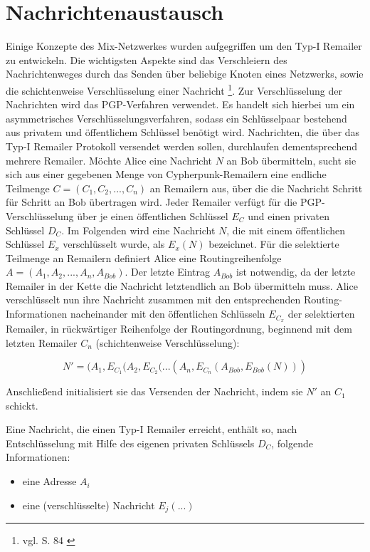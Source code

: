 \section{Nachrichtenaustausch}
Einige Konzepte des Mix-Netzwerkes wurden aufgegriffen um den Typ-I Remailer zu entwickeln. Die wichtigsten Aspekte sind das Verschleiern des Nachrichtenweges durch das Senden über beliebige Knoten eines Netzwerks, sowie die schichtenweise Verschlüsselung einer Nachricht \footnote{vgl. S. 84 \cite{sambleben2013informationstechnologie}}. Zur Verschlüsselung der Nachrichten wird das PGP-Verfahren verwendet. Es handelt sich hierbei um ein asymmetrisches Verschlüsselungsverfahren, sodass ein Schlüsselpaar bestehend aus privatem und öffentlichem Schlüssel benötigt wird.
Nachrichten, die über das Typ-I Remailer Protokoll versendet werden sollen, durchlaufen dementsprechend mehrere Remailer. Möchte Alice eine Nachricht \(N\) an Bob übermitteln, sucht sie sich aus einer gegebenen Menge von Cypherpunk-Remailern eine endliche Teilmenge \(C = (C_1, C_2, ..., C_n)\) an Remailern aus, über die die Nachricht Schritt für Schritt an Bob übertragen wird. Jeder Remailer verfügt für die PGP-Verschlüsselung über je einen öffentlichen Schlüssel \(E_C\) und einen privaten Schlüssel \(D_C\). Im Folgenden wird eine Nachricht \(N\), die mit einem öffentlichen Schlüssel \(E_x\) verschlüsselt wurde, als \(E_x(N)\) bezeichnet. Für die selektierte Teilmenge an Remailern definiert Alice eine Routingreihenfolge \(A = (A_1, A_2, ..., A_n, A_{Bob})\). Der letzte Eintrag \(A_{Bob}\) ist notwendig, da der letzte Remailer in der Kette die Nachricht letztendlich an Bob übermitteln muss.
Alice verschlüsselt nun ihre Nachricht zusammen mit den entsprechenden Routing-Informationen nacheinander mit den öffentlichen Schlüsseln \(E_{C_x}\) der selektierten Remailer, in rückwärtiger Reihenfolge der Routingordnung, beginnend mit dem letzten Remailer \(C_n\) (schichtenweise Verschlüsselung):

\begin{equation}
N' = (A_1, E_{C_1}(A_2, E_{C_2} (... (A_n,  E_{C_n}(A_{Bob}, E_{Bob}(N)))
\end{equation}

Anschließend initialisiert sie das Versenden der Nachricht, indem sie \(N'\) an \(C_1\) schickt.

Eine Nachricht, die einen Typ-I Remailer erreicht, enthält so, nach Entschlüsselung mit Hilfe des eigenen privaten Schlüssels \(D_C\), folgende Informationen:
\begin{itemize}
\item eine Adresse \(A_i\)
\item eine (verschlüsselte) Nachricht \(E_j(...)\)
\end{itemize}

